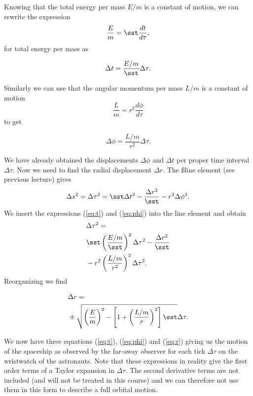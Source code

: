 {\begin{multicols}{2}
Knowing that the total energy per mass $E/m$ is a constant of motion, we can rewrite the expression
\[
\frac{E}{m}=\sst\frac{dt}{d\tau},
\]
for total energy per mass as
\begin{formbox}
\begin{equation}
\label{eq:t}
\Delta t=\frac{E/m}{\sst}\Delta\tau.
\end{equation}
\end{formbox}
Similarly we can use that the angular momentum per mass $L/m$ is a constant of motion
\[
\frac{L}{m}=r^2\frac{d\phi}{d\tau}
\]
to get\\
\begin{formbox}
\begin{equation}
\label{eq:phi}
\Delta\phi=\frac{L/m}{r^2}\Delta\tau.
\end{equation}
\end{formbox}
We have already obtained the displacements $\Delta\phi$ and $\Delta t$ per proper time interval $\Delta\tau$. Now we need to find the radial displacement $\Delta r$. The \ss line element (see previous lecture) gives
\[
\Delta s^2=\Delta\tau^2=\sst\Delta t^2-\frac{\Delta r^2}{\sst}-r^2\Delta\phi^2.
\]
We insert the expressions (\ref{eq:t}) and (\ref{eq:phi}) into the line element and obtain
\begin{align*}
&\Delta\tau^2=\\
&\sst\left(\frac{E/m}{\sst}\right)^2\Delta\tau^2-\frac{\Delta r^2}{\sst}\\
&-r^2\left(\frac{L/m}{r^2}\right)^2\Delta\tau^2.
\end{align*}
Reorganizing we find
\begin{formbox}
\begin{align}
\label{eq:r}
&\Delta r=\nonumber\\
&\pm\sqrt{\left(\frac{E}{m}\right)^2-\left[1+\left(\frac{L/m}{r}\right)^2\right]\sst}\Delta\tau.
\end{align}
\end{formbox}
We now have three equations (\ref{eq:t}), (\ref{eq:phi}) and (\ref{eq:r}) giving us the motion of the spaceship as observed by the far-away observer for each tick $\Delta\tau$ on the wristwatch of the astronauts. Note that these expressions in reality give the first order terms of a Taylor expansion in $\Delta\tau$. The second derivative terms are not included (and will not be treated in this course) and we can therefore not use them in this form to describe a full orbital motion. 


\end{multicols}}
